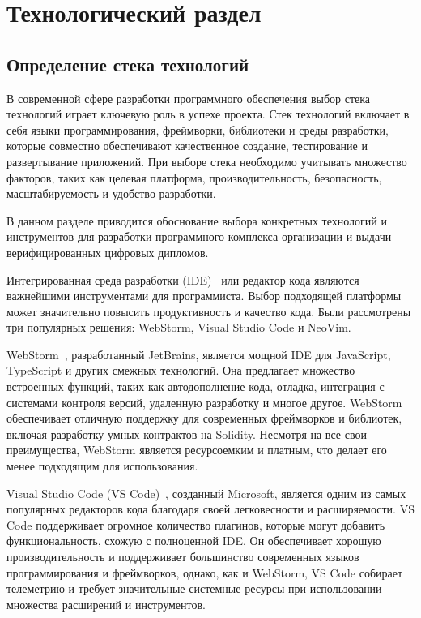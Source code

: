 \section{Технологический раздел}
\label{sec:technological}

\subsection{Определение стека технологий}

В современной сфере разработки программного обеспечения выбор стека технологий играет ключевую роль в успехе проекта. Стек технологий включает в себя языки программирования, фреймворки, библиотеки и среды разработки, которые совместно обеспечивают качественное создание, тестирование и развертывание приложений. При выборе стека необходимо учитывать множество факторов, таких как целевая платформа, производительность, безопасность, масштабируемость и удобство разработки.

В данном разделе приводится обоснование выбора конкретных технологий и инструментов для разработки программного комплекса организации и выдачи верифицированных цифровых дипломов.

Интегрированная среда разработки (IDE)~\cite{bib:ide_is} или редактор кода являются важнейшими инструментами для программиста. Выбор подходящей платформы может значительно повысить продуктивность и качество кода. Были рассмотрены три популярных решения: WebStorm, Visual Studio Code и NeoVim.

WebStorm~\cite{bib:webstorm}, разработанный JetBrains, является мощной IDE для JavaScript, TypeScript и других смежных технологий. Она предлагает множество встроенных функций, таких как автодополнение кода, отладка, интеграция с системами контроля версий, удаленную разработку и многое другое. WebStorm обеспечивает отличную поддержку для современных фреймворков и библиотек, включая разработку умных контрактов на Solidity. Несмотря на все свои преимущества, WebStorm является ресурсоемким и платным, что делает его менее подходящим для использования.

Visual Studio Code (VS Code)~\cite{bib:vscode}, созданный Microsoft, является одним из самых популярных редакторов кода благодаря своей легковесности и расширяемости. VS Code поддерживает огромное количество плагинов, которые могут добавить функциональность, схожую с полноценной IDE. Он обеспечивает хорошую производительность и поддерживает большинство современных языков программирования и фреймворков, однако, как и WebStorm, VS Code собирает телеметрию и требует значительные системные ресурсы при использовании множества расширений и инструментов.

